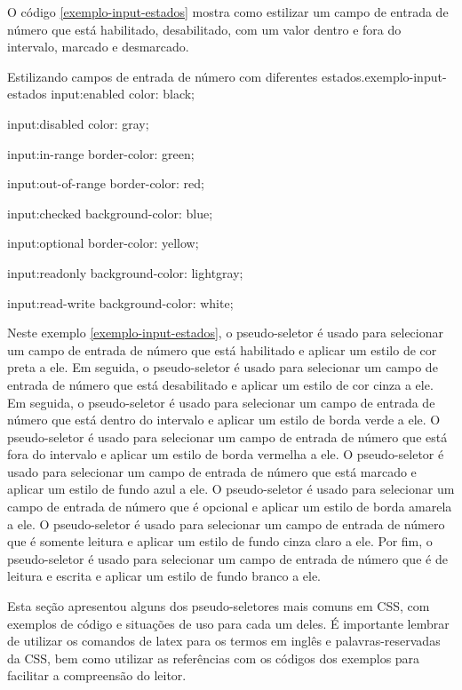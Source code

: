 O código \ref{exemplo-input-estados} mostra como estilizar um campo de entrada de número que está habilitado, desabilitado, com um valor dentro e fora do intervalo, marcado e desmarcado.

\begin{csscode}{Estilizando campos de entrada de número com diferentes estados.}{exemplo-input-estados}
input:enabled {
    color: black;
}

input:disabled {
    color: gray;
}

input:in-range {
    border-color: green;
}

input:out-of-range {
    border-color: red;
}

input:checked {
    background-color: blue;
}

input:optional {
    border-color: yellow;
}

input:readonly {
    background-color: lightgray;
}

input:read-write {
    background-color: white;
}
\end{csscode}

Neste exemplo \ref{exemplo-input-estados}, o pseudo-seletor  é usado para selecionar um campo de entrada de número que está habilitado e aplicar um estilo de cor preta a ele. Em seguida, o pseudo-seletor  é usado para selecionar um campo de entrada de número que está desabilitado e aplicar um estilo de cor cinza a ele. Em seguida, o pseudo-seletor  é usado para selecionar um campo de entrada de número que está dentro do intervalo e aplicar um estilo de borda verde a ele. O pseudo-seletor  é usado para selecionar um campo de entrada de número que está fora do intervalo e aplicar um estilo de borda vermelha a ele. O pseudo-seletor  é usado para selecionar um campo de entrada de número que está marcado e aplicar um estilo de fundo azul a ele. O pseudo-seletor  é usado para selecionar um campo de entrada de número que é opcional e aplicar um estilo de borda amarela a ele. O pseudo-seletor  é usado para selecionar um campo de entrada de número que é somente leitura e aplicar um estilo de fundo cinza claro a ele. Por fim, o pseudo-seletor  é usado para selecionar um campo de entrada de número que é de leitura e escrita e aplicar um estilo de fundo branco a ele.

Esta seção apresentou alguns dos pseudo-seletores mais comuns em CSS, com exemplos de código e situações de uso para cada um deles. É importante lembrar de utilizar os comandos de latex  para os termos em inglês e palavras-reservadas da CSS, bem como utilizar as referências com os códigos dos exemplos para facilitar a compreensão do leitor.